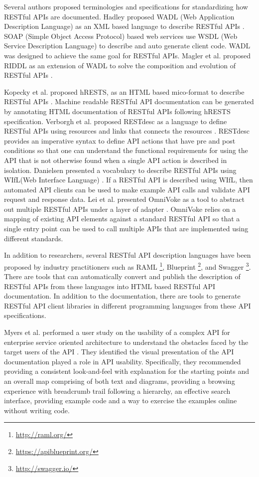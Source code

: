 \documentclass[11pt,oneside]{book}
\begin{document}
Several authors proposed terminologies and specifications for standardizing how RESTful APIs are documented. Hadley proposed WADL (Web Application Description Language) as an XML based language to describe RESTful APIs \cite{hadley2006web}. SOAP (Simple Object Access Protocol) based web services use WSDL (Web Service Description Language) to describe and auto generate client code. WADL was designed to achieve the same goal for RESTful APIs. Magler et al. proposed RIDDL as an extension of WADL to solve the composition and evolution of RESTful APIs \cite{mangler2010origin}.

Kopecky et al. proposed hRESTS, as an HTML based mico-format to describe RESTful APIs \cite{Kopecky_hrests}. Machine readable RESTful API documentation can be generated by annotating HTML documentation of RESTful APIs following hRESTS specification. Verborgh et al. proposed RESTdesc as a language to define RESTful APIs using resources and links that connects the resources \cite{RESTdesc}. RESTdesc provides an imperative syntax to define API actions that have pre and post conditions so that one can understand the functional requirements for using the API that is not otherwise found when a single API action is described in isolation. Danielsen presented a vocabulary to describe RESTful APIs using WIfL(Web Interface Language) \cite{Danielsen_validation}. If a RESTful API is described using WIfL, then automated API clients can be used to make  example API calls and validate API request and response data. Lei et al. presented OmniVoke as a tool to abstract out multiple RESTful APIs under a layer of adapter \cite{Ning_omnivoke}. OmniVoke relies on a mapping of existing API elements against a standard RESTful API so that a single entry point can be used to call multiple APIs that are implemented using different standards.

In addition to researchers, several RESTful API description languages have been proposed by industry practitioners such as RAML \footnote{\url{http://raml.org/}}, Blueprint \footnote{\url{https://apiblueprint.org/}}, and Swagger \footnote{\url{http://swagger.io/}}. There are tools that can automatically convert and publish the description of RESTful APIs from these languages into HTML based RESTful API documentation. In addition to the documentation, there are tools to generate RESTful API client libraries in different programming languages from these API specifications.

Myers et al. performed a user study on the usability of a complex API for enterprise service oriented architecture to understand the obstacles faced by the target users of the API \cite{Myers_study}. They identified the visual presentation of the API documentation played a role in API usability. Specifically, they recommended providing a consistent look-and-feel with explanation for the starting points and an overall map comprising of both text and diagrams, providing a browsing experience with breadcrumb trail following a hierarchy, an effective search interface, providing example code and a way to exercise the examples online without writing code.
\end{document}
